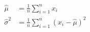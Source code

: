 \begin{align}
 \hat\mu
 &=\frac1n\sum_{i=1}^n x_i
   \label{eq:mean}\\
 \hat\sigma^2
 &=\frac1n\sum_{i=1}^n
   (x_i-\hat\mu)^2
   \label{eq:variance}
\end{align}
